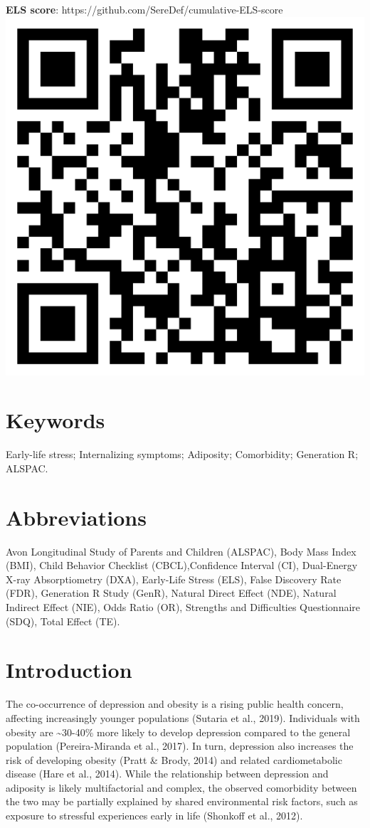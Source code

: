 \documentclass[
  letterpaper,
  DIV=11,
  numbers=noendperiod]{scrreport}
\begin{document}
\textbf{ELS score}:
https://github.com/SereDef/cumulative-ELS-score\newline
\includegraphics[width=0.2\linewidth,height=\textheight,keepaspectratio]{2.Chapter/../img/qrcode_els_repo.png}

\section*{Keywords}\label{keywords}


Early-life stress; Internalizing symptoms; Adiposity; Comorbidity;
Generation R; ALSPAC.

\section*{Abbreviations}\label{abbreviations}


Avon Longitudinal Study of Parents and Children (ALSPAC), Body Mass
Index (BMI), Child Behavior Checklist (CBCL),Confidence Interval (CI),
Dual-Energy X-ray Absorptiometry (DXA), Early-Life Stress (ELS), False
Discovery Rate (FDR), Generation R Study (GenR), Natural Direct Effect
(NDE), Natural Indirect Effect (NIE), Odds Ratio (OR), Strengths and
Difficulties Questionnaire (SDQ), Total Effect (TE).

\newpage

\section{Introduction}\label{introduction}

The co-occurrence of depression and obesity is a rising public health
concern, affecting increasingly younger populations (Sutaria et al.,
2019). Individuals with obesity are \textasciitilde30-40\% more likely
to develop depression compared to the general population
(Pereira-Miranda et al., 2017). In turn, depression also increases the
risk of developing obesity (Pratt \& Brody, 2014) and related
cardiometabolic disease (Hare et al., 2014). While the relationship
between depression and adiposity is likely multifactorial and complex,
the observed comorbidity between the two may be partially explained by
shared environmental risk factors, such as exposure to stressful
experiences early in life (Shonkoff et al., 2012).
\end{document}
